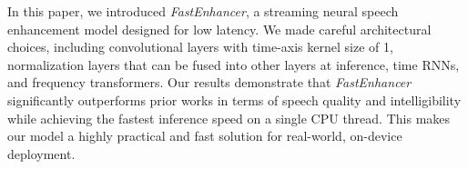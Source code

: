 

In this paper, we introduced \textit{FastEnhancer}, a streaming neural speech enhancement model designed for low latency. We made careful architectural choices, including convolutional layers with time-axis kernel size of 1, normalization layers that can be fused into other layers at inference, time RNNs, and frequency transformers. Our results demonstrate that \textit{FastEnhancer} significantly outperforms prior works in terms of speech quality and intelligibility while achieving the fastest inference speed on a single CPU thread. This makes our model a highly practical and fast solution for real-world, on-device deployment.